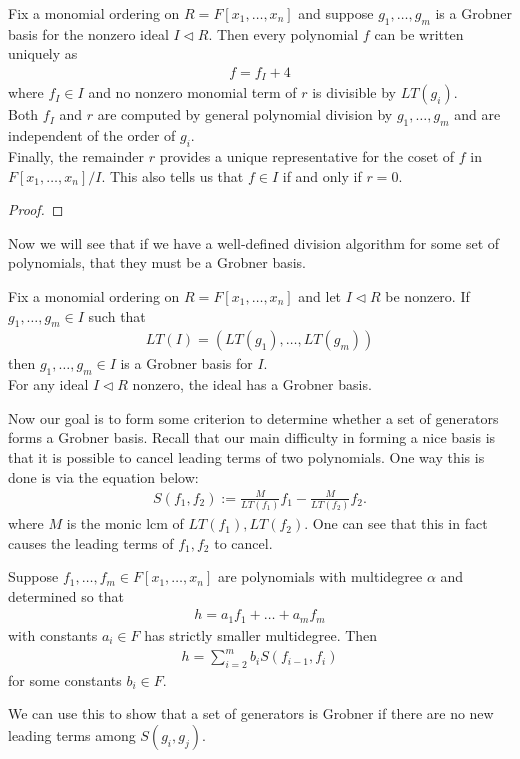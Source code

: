 \documentclass{memoir}
\begin{document}
\begin{thm}
	Fix a monomial ordering on \(R = F[x_1,\ldots,x_n]\) and suppose \(g_1,\ldots,g_m\) is a Grobner basis for the nonzero ideal \(I\triangleleft R\). Then every polynomial \(f\) can be written uniquely as
	\begin{align*}
		f = f_I + 4
	\end{align*}
	where \(f_I \in I\) and no nonzero monomial term of \(r\) is divisible by \(LT(g_i)\).\\

	Both \(f_I\) and \(r\) are computed by general polynomial division by \(g_1,\ldots,g_m\) and are independent of the order of \(g_i\).\\

	Finally, the remainder \(r\) provides a unique representative for the coset of \(f\) in \(F[x_1,\ldots,x_n] / I\). This also tells us that \(f \in I\) if and only if \(r=0\).
\end{thm}
\begin{proof}
	
\end{proof}
Now we will see that if we have a well-defined division algorithm for some set of polynomials, that they must be a Grobner basis.

\begin{prop}
	Fix a monomial ordering on \(R = F[x_1,\ldots,x_n]\) and let \(I \triangleleft R\) be nonzero. If \(g_1,\ldots,g_m \in I\) such that
	\begin{align*}
		LT(I) = (LT(g_1),\ldots,LT(g_m))
	\end{align*}
	then \(g_1,\ldots,g_m \in I\) is a Grobner basis for \(I\).\\

	For any ideal \(I\triangleleft R\) nonzero, the ideal has a Grobner basis.
\end{prop}

Now our goal is to form some criterion to determine whether a set of generators forms a Grobner basis. Recall that our main difficulty in forming a nice basis is that it is possible to cancel leading terms of two polynomials. One way this is done is via the equation below:
\begin{align*}
	S(f_1,f_2) := \frac{M}{LT(f_1)}f_1 - \frac{M}{LT(f_2)}f_2.
\end{align*}
where \(M\) is the monic lcm of \(LT(f_1),LT(f_2)\). One can see that this in fact causes the leading terms of \(f_1,f_2\) to cancel.

\begin{lemma}
	Suppose \(f_1,\ldots,f_m \in F[x_1,\ldots,x_n]\) are polynomials with multidegree \(\alpha \) and determined so that
	\begin{align*}
		h = a_1f_1 + \ldots + a_mf_m
	\end{align*}
	with constants \(a_i \in F\) has strictly smaller multidegree. Then
	\begin{align*}
		h = \sum_{i=2}^{m} b_i S(f_{i-1},f_i)
	\end{align*}
	for some constants \(b_i \in F\).
\end{lemma}
We can use this to show that a set of generators is Grobner if there are no new leading terms among \(S(g_i,g_j)\).
\end{document}
